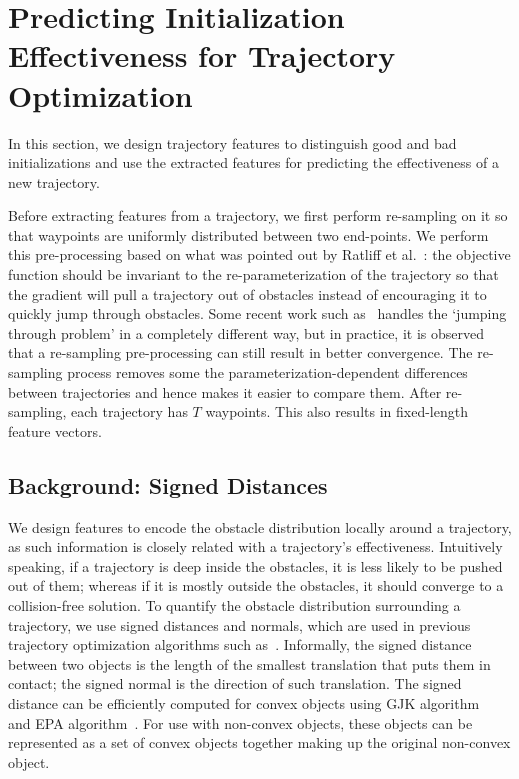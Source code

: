 \documentclass[letterpaper, 10 pt, conference]{ieeeconf}  %
\begin{document}
\section{Predicting Initialization Effectiveness for Trajectory Optimization}
\label{sec:predict}
In this section, we design trajectory features to distinguish good and bad initializations and use the extracted features for predicting the effectiveness of a new trajectory.


Before extracting features from a trajectory, we first perform re-sampling on it so that waypoints are uniformly distributed between two end-points.
We perform this pre-processing based on what was pointed out by Ratliff et al.~\cite{Ratliff:2009:CGO}: the objective function should be invariant to the re-parameterization of the trajectory so that the gradient will pull a trajectory out of obstacles instead of encouraging it to quickly jump through obstacles. Some recent work such as~\cite{Schulman:2013:FLO} handles the `jumping through problem' in a completely different way, but in practice, it is observed that a re-sampling pre-processing can still result in better convergence. 
The re-sampling process removes some the parameterization-dependent differences between trajectories and hence makes it easier to compare them. After re-sampling, each trajectory has $T$ waypoints. This also results in fixed-length feature vectors.


\subsection{Background: Signed Distances}
We design features to encode the obstacle distribution locally around a trajectory, as such information is closely related with a trajectory's effectiveness. Intuitively speaking, if a trajectory is deep inside the obstacles, it is less likely to be pushed out of them; whereas if it is mostly outside the obstacles, it should converge to a collision-free solution. To quantify the obstacle distribution surrounding a trajectory, we use signed distances and normals, which are used in previous trajectory optimization algorithms such as~\cite{Schulman:2013:FLO}. Informally, the signed distance between two objects is the length of the smallest translation that puts them in contact; the signed normal is the direction of such translation. The signed distance can be efficiently computed for convex objects using GJK algorithm~\cite{Gilbert:1988:GJK} and EPA algorithm~\cite{Bergen:2001:EPA}.   For use with non-convex objects, these objects can be represented as a set of convex objects together making up the original non-convex object.
\end{document}
